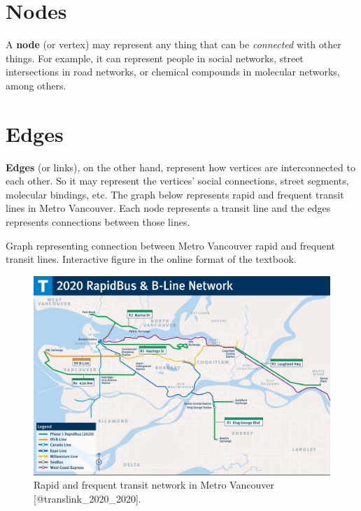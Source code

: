 \documentclass[
]{book}
\begin{document}
\hypertarget{nodes}{%
\section{Nodes}\label{nodes}}

A \textbf{node} (or vertex) may represent any thing that can be \emph{connected} with other things. For example, it can represent people in social networks, street intersections in road networks, or chemical compounds in molecular networks, among others.

\hypertarget{edges}{%
\section{Edges}\label{edges}}

\textbf{Edges} (or links), on the other hand, represent how vertices are interconnected to each other. So it may represent the vertices' social connections, street segments, molecular bindings, etc. The graph below represents rapid and frequent transit lines in Metro Vancouver. Each node represents a transit line and the edges represents connections between those lines.

\label{fig:8-vancouver-transit-graph}Graph representing connection between Metro Vancouver rapid and frequent transit lines. Interactive figure in the online format of the textbook.

\begin{figure}
\includegraphics[width=15.93in]{images/08-metro_vancouver_transit_network} \caption{Rapid and frequent transit network in Metro Vancouver [@translink_2020_2020].}\label{fig:8-vancouver-transit-network}
\end{figure}
\end{document}
